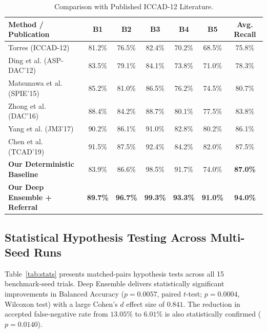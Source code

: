 \documentclass[11pt,journal,onecolumn]{IEEEtran}
\begin{document}
\begin{table}[htbp]
\caption{Comparison with Published ICCAD-12 Literature.}
\label{tab:lit_comp}
\centering
\begin{tabular}{lcccccc}
\toprule
\textbf{Method / Publication} & \textbf{B1} & \textbf{B2} & \textbf{B3} & \textbf{B4} & \textbf{B5} & \textbf{Avg. Recall} \\
\midrule
Torres (ICCAD-12)~\cite{torres2012iccad} & 81.2\% & 76.5\% & 82.4\% & 70.2\% & 68.5\% & 75.8\% \\
Ding et al. (ASP-DAC'12)~\cite{ding2012epic} & 83.5\% & 79.1\% & 84.1\% & 73.8\% & 71.0\% & 78.3\% \\
Matsunawa et al. (SPIE'15)~\cite{matsunawa2015new} & 85.2\% & 81.0\% & 86.5\% & 76.2\% & 74.5\% & 80.7\% \\
Zhong et al. (DAC'16)~\cite{zhong2016deep} & 88.4\% & 84.2\% & 88.7\% & 80.1\% & 77.5\% & 83.8\% \\
Yang et al. (JM3'17)~\cite{yang2017imbalance} & 90.2\% & 86.1\% & 91.0\% & 82.8\% & 80.2\% & 86.1\% \\
Chen et al. (TCAD'19)~\cite{chen2020semi} & 91.5\% & 87.5\% & 92.4\% & 84.2\% & 82.0\% & 87.5\% \\
\midrule
\textbf{Our Deterministic Baseline} & 83.9\% & 86.6\% & 98.5\% & 91.7\% & 74.0\% & \textbf{87.0\%} \\
\textbf{Our Deep Ensemble + Referral} & \textbf{89.7\%} & \textbf{96.7\%} & \textbf{99.3\%} & \textbf{93.3\%} & \textbf{91.0\%} & \textbf{94.0\%} \\
\bottomrule
\end{tabular}
\end{table}

\subsection{Statistical Hypothesis Testing Across Multi-Seed Runs}
Table~\ref{tab:stats} presents matched-pairs hypothesis tests across all 15 benchmark-seed trials. Deep Ensemble delivers statistically significant improvements in Balanced Accuracy ($p = 0.0057$, paired $t$-test; $p = 0.0004$, Wilcoxon test) with a large Cohen's $d$ effect size of $0.841$. The reduction in accepted false-negative rate from $13.05\%$ to $6.01\%$ is also statistically confirmed ($p = 0.0140$).
\end{document}
